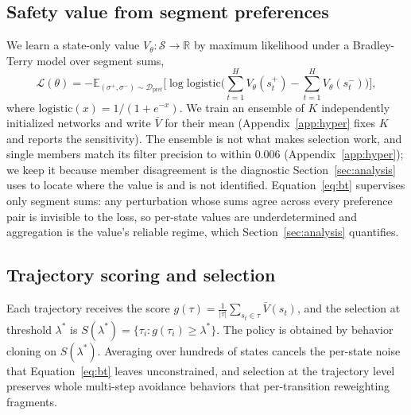 \documentclass{article} %
\newcommand{\Vth}{V_\theta}
\newcommand{\Vbar}{\bar{V}}
\newcommand{\Dpref}{\mathcal{D}_{\mathrm{pref}}}
\newcommand{\segA}{\sigma^{+}}
\newcommand{\segB}{\sigma^{-}}
\begin{document}
\subsection{Safety value from segment preferences}
\label{sec:value}
We learn a state-only value $\Vth: \mathcal{S} \to \mathbb{R}$ by maximum likelihood under a Bradley-Terry model \citep{bradley1952rank} over segment sums,
\begin{equation}
\label{eq:bt}
\mathcal{L}(\theta) = -\mathbb{E}_{(\segA, \segB) \sim \Dpref}\Big[\log \mathrm{logistic}\Big(\textstyle\sum_{t=1}^{H} \Vth(s_t^{+}) - \sum_{t=1}^{H} \Vth(s_t^{-})\Big)\Big],
\end{equation}
where $\mathrm{logistic}(x) = 1/(1+e^{-x})$. We train an ensemble of $K$ independently initialized networks and write $\Vbar$ for their mean (Appendix~\ref{app:hyper} fixes $K$ and reports the sensitivity). The ensemble is not what makes selection work, and single members match its filter precision to within $0.006$ (Appendix~\ref{app:hyper}); we keep it because member disagreement is the diagnostic Section~\ref{sec:analysis} uses to locate where the value is and is not identified. Equation~\ref{eq:bt} supervises only segment sums: any perturbation whose sums agree across every preference pair is invisible to the loss, so per-state values are underdetermined and aggregation is the value's reliable regime, which Section~\ref{sec:analysis} quantifies.

\subsection{Trajectory scoring and selection}
\label{sec:scoring}
Each trajectory receives the score $g(\tau) = \frac{1}{|\tau|} \sum_{s_t \in \tau} \Vbar(s_t)$, and the selection at threshold $\lambda^{*}$ is $S(\lambda^{*}) = \{\tau_i : g(\tau_i) \ge \lambda^{*}\}$. The policy is obtained by behavior cloning on $S(\lambda^{*})$. Averaging over hundreds of states cancels the per-state noise that Equation~\ref{eq:bt} leaves unconstrained, and selection at the trajectory level preserves whole multi-step avoidance behaviors that per-transition reweighting fragments.
\end{document}
